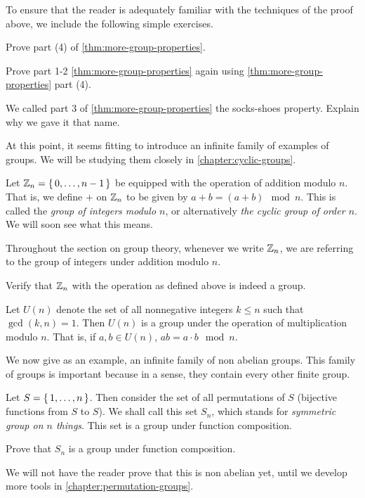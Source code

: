 \documentclass[./main.tex]{subfiles}
\begin{document}
To ensure that the reader is adequately familiar with the techniques of the proof above,
we include the following simple exercises. 
\begin{exercise}
\label{exercise:group-cancellation-law}
Prove part (4) of \cref{thm:more-group-properties}.
\end{exercise}

\begin{exercise}
    Prove part 1-2 \cref{thm:more-group-properties} again using \cref{thm:more-group-properties} part (4).
\end{exercise}

\begin{exercise}
    We called part 3 of \cref{thm:more-group-properties} the socks-shoes
    property. Explain why we gave it that name. 
\end{exercise}

At this point, it seems fitting to introduce an infinite family of examples of
groups. We will be studying them closely in \cref{chapter:cyclic-groups}. 
\begin{example}
    Let $\mathbb{Z}_n = \set{0, \dots, n-1}$ be equipped with the operation of addition
    modulo $n$. That is, we define $+$ on $\mathbb{Z}_n$ to be given by $a + b = (a +
    b) \mod n$. This is called the \emph{group of integers modulo $n$}, or
    alternatively \emph{the cyclic group of order $n$}. We will soon see what
    this means.
\end{example}
Throughout the section on group theory, whenever we write $\mathbb{Z}_n$, we are
referring to the group of integers under addition modulo $n$. 

\begin{exercise}
    Verify that $\mathbb{Z}_n$ with the operation as defined above is indeed a group.
\end{exercise}

\begin{example}
    Let $U(n)$ denote the set of all nonnegative integers $k \leq n$ such that
    $\gcd(k, n) = 1$. Then $U(n)$ is a group under the operation of
    multiplication modulo $n$. That is, if $a, b \in U(n)$, $ab = a \cdot b \mod
    n$.
\end{example}

We now give as an example, an infinite family of non abelian groups. This family
of groups is important because in a sense, they contain every other finite
group. 
\begin{example}
\label{example:symmetric-groups}
    Let $S = \set{1, \dots, n}$. Then consider the set of all permutations of
    $S$ (bijective functions from $S$ to $S$). We shall call this set $S_n$,
    which stands for \emph{symmetric group on $n$ things}. This set is a group
    under function composition.
\end{example}
\begin{exercise}
    Prove that $S_n$ is a group under function composition.
\end{exercise}
We will not have the reader prove that this is non abelian yet, until we develop
more tools in \cref{chapter:permutation-groups}.
\end{document}
